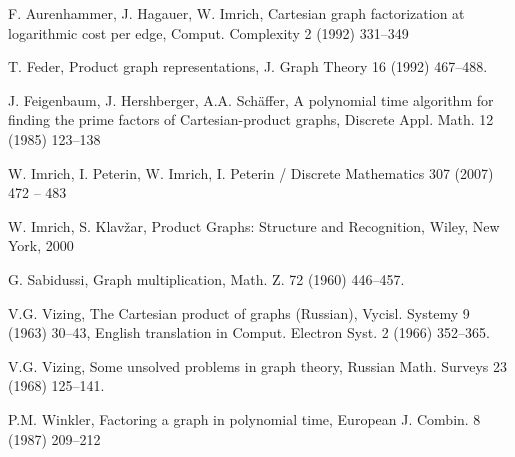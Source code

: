 \documentclass[12pt,a4paper,titlepage]{article}
\begin{document}
\begin{thebibliography}{99}
 F. Aurenhammer, J. Hagauer, W. Imrich, 
Cartesian graph factorization at logarithmic cost per edge, Comput. Complexity 2 (1992) 331–349

 T. Feder, 
Product graph representations, J. Graph Theory 16 (1992) 467–488.

 J. Feigenbaum, J. Hershberger, A.A. Schäffer, 
A polynomial time algorithm for finding the prime factors of Cartesian-product graphs, Discrete Appl. Math. 12 (1985) 123–138

 W. Imrich, I. Peterin, 
W. Imrich, I. Peterin / Discrete Mathematics 307 (2007) 472 – 483

 W. Imrich, S. Klavžar, 
Product Graphs: Structure and Recognition, Wiley, New York, 2000

 G. Sabidussi,
Graph multiplication, Math. Z. 72 (1960) 446–457.

 V.G. Vizing,
The Cartesian product of graphs (Russian), Vycisl. Systemy 9 (1963) 30–43, English translation in Comput. Electron Syst. 2 (1966) 352–365.

 V.G. Vizing, 
Some unsolved problems in graph theory, Russian Math. Surveys 23 (1968) 125–141.

 P.M. Winkler, 
Factoring a graph in polynomial time, European J. Combin. 8 (1987) 209–212
\end{thebibliography}
\end{document}
